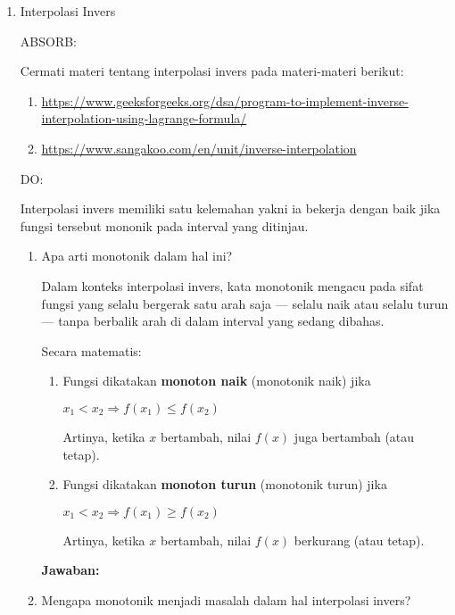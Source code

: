 \documentclass[a4paper]{article}
\begin{document}
\pagestyle{empty}

\begin{enumerate}[itemsep=1em,leftmargin=*]
  \item Interpolasi Invers
  
  ABSORB:

  Cermati materi tentang interpolasi invers pada materi-materi berikut:
  \begin{enumerate}
    \item \url{https://www.geeksforgeeks.org/dsa/program-to-implement-inverse-interpolation-using-lagrange-formula/}
    \item \url{https://www.sangakoo.com/en/unit/inverse-interpolation}
  \end{enumerate}

  DO:

  Interpolasi invers memiliki satu kelemahan yakni ia bekerja dengan baik jika fungsi tersebut mononik pada interval yang ditinjau.

  \begin{enumerate}
    \item Apa arti monotonik dalam hal ini?
    
    Dalam konteks interpolasi invers, kata monotonik mengacu pada sifat fungsi yang selalu bergerak satu arah saja — selalu naik atau selalu turun — tanpa berbalik arah di dalam interval yang sedang dibahas.

    Secara matematis:

    \begin{enumerate}
      \item Fungsi dikatakan \textbf{monoton naik} (monotonik naik) jika
      
      \(x_1 < x_2 \Rightarrow f(x_1) \le f(x_2)\)

      Artinya, ketika \(x\) bertambah, nilai \(f(x)\) juga bertambah (atau tetap).

      \item Fungsi dikatakan \textbf{monoton turun} (monotonik turun) jika
      
      \(x_1 < x_2 \Rightarrow f(x_1) \ge f(x_2)\)

      Artinya, ketika \(x\) bertambah, nilai \(f(x)\) berkurang (atau tetap).
    \end{enumerate}
    
    \textbf{Jawaban:}
    
    \item Mengapa monotonik menjadi masalah dalam hal interpolasi invers?
    

\end{enumerate}
\end{enumerate}
\end{document}
